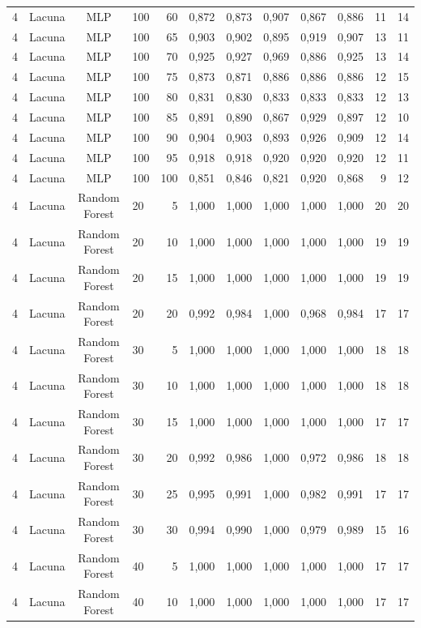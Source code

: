 \begin{longtable}{ccclrrrrrrrr}
4 & Lacuna & MLP & 100 & 60 & 0,872 & 0,873 & 0,907 & 0,867 & 0,886 & 11 & 14 \\
4 & Lacuna & MLP & 100 & 65 & 0,903 & 0,902 & 0,895 & 0,919 & 0,907 & 13 & 11 \\
4 & Lacuna & MLP & 100 & 70 & 0,925 & 0,927 & 0,969 & 0,886 & 0,925 & 13 & 14 \\
4 & Lacuna & MLP & 100 & 75 & 0,873 & 0,871 & 0,886 & 0,886 & 0,886 & 12 & 15 \\
4 & Lacuna & MLP & 100 & 80 & 0,831 & 0,830 & 0,833 & 0,833 & 0,833 & 12 & 13 \\
4 & Lacuna & MLP & 100 & 85 & 0,891 & 0,890 & 0,867 & 0,929 & 0,897 & 12 & 10 \\
4 & Lacuna & MLP & 100 & 90 & 0,904 & 0,903 & 0,893 & 0,926 & 0,909 & 12 & 14 \\
4 & Lacuna & MLP & 100 & 95 & 0,918 & 0,918 & 0,920 & 0,920 & 0,920 & 12 & 11 \\
4 & Lacuna & MLP & 100 & 100 & 0,851 & 0,846 & 0,821 & 0,920 & 0,868 & 9 & 12 \\
4 & Lacuna & Random Forest & 20 & 5 & 1,000 & 1,000 & 1,000 & 1,000 & 1,000 & 20 & 20 \\
4 & Lacuna & Random Forest & 20 & 10 & 1,000 & 1,000 & 1,000 & 1,000 & 1,000 & 19 & 19 \\
4 & Lacuna & Random Forest & 20 & 15 & 1,000 & 1,000 & 1,000 & 1,000 & 1,000 & 19 & 19 \\
4 & Lacuna & Random Forest & 20 & 20 & 0,992 & 0,984 & 1,000 & 0,968 & 0,984 & 17 & 17 \\
4 & Lacuna & Random Forest & 30 & 5 & 1,000 & 1,000 & 1,000 & 1,000 & 1,000 & 18 & 18 \\
4 & Lacuna & Random Forest & 30 & 10 & 1,000 & 1,000 & 1,000 & 1,000 & 1,000 & 18 & 18 \\
4 & Lacuna & Random Forest & 30 & 15 & 1,000 & 1,000 & 1,000 & 1,000 & 1,000 & 17 & 17 \\
4 & Lacuna & Random Forest & 30 & 20 & 0,992 & 0,986 & 1,000 & 0,972 & 0,986 & 18 & 18 \\
4 & Lacuna & Random Forest & 30 & 25 & 0,995 & 0,991 & 1,000 & 0,982 & 0,991 & 17 & 17 \\
4 & Lacuna & Random Forest & 30 & 30 & 0,994 & 0,990 & 1,000 & 0,979 & 0,989 & 15 & 16 \\
4 & Lacuna & Random Forest & 40 & 5 & 1,000 & 1,000 & 1,000 & 1,000 & 1,000 & 17 & 17 \\
4 & Lacuna & Random Forest & 40 & 10 & 1,000 & 1,000 & 1,000 & 1,000 & 1,000 & 17 & 17 \\

\end{longtable}
